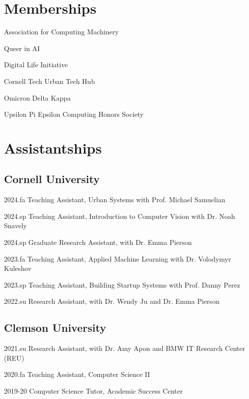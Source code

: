 \documentclass[11pt,letterpaper]{report}
\newcommand{\listitemspace}{0.25em}
\renewenvironment{itemize}
{\begin{list}{}{\setlength{\leftmargin}{0em}
                \setlength{\parskip}{0em}
                \setlength{\itemsep}{\listitemspace}
                \setlength{\parsep}{\listitemspace}}}
{\end{list}}
\begin{document}
    
    \section*{Memberships}

    \begin{itemize}

        \item Association for Computing Machinery 
        \item Queer in AI
        \item Digital Life Initiative 
        \item Cornell Tech Urban Tech Hub
        \item Omicron Delta Kappa 
        \item Upsilon Pi Epsilon Computing Honors Society 

    \end{itemize}


    \section*{Assistantships}

    \subsection*{Cornell University}
    \begin{tablist} 
        \item[2024.fa] \tab{}Teaching Assistant, Urban Systems with Prof. Michael Samuelian 
        \item[2024.sp] \tab{}Teaching Assistant, Introduction to Computer Vision with Dr. Noah Snavely 
        \item[2024.sp] \tab{}Graduate Research Assistant, with Dr. Emma Pierson 
        \item[2023.fa] \tab{}Teaching Assistant, Applied Machine Learning with Dr. Volodymyr Kuleshov
        \item[2023.sp] \tab{}Teaching Assistant, Building Startup Systems with Prof. Danny Perez 
        \item[2022.su] \tab{}Research Assistant, with Dr. Wendy Ju and Dr. Emma Pierson
    \end{tablist} 

    \subsection*{Clemson University} 
    \begin{tablist}
        \item[2021.su] \tab{}Research Assistant, with Dr. Amy Apon and BMW IT Research Center (REU)
        \item[2020.fa] \tab{}Teaching Assistant, Computer Science II
        \item[2019-20] \tab{}Computer Science Tutor, Academic Success Center 

    \end{tablist}
\end{document}

